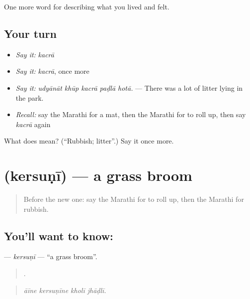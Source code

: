 \begin{grammarlens}[title={What you've built}]
One more word for describing what you lived and felt.
\end{grammarlens}

\subsection*{Your turn}
\begin{itemize}
\raggedright
  \item \emph{Say it:} \emph{kacrā}
  \item \emph{Say it:} \emph{kacrā}, once more
  \item \emph{Say it:} \emph{udyānāt khūp kacrā paḍlā hotā.} — There was a lot of litter lying in the park.
  \item \emph{Recall:} say the Marathi for a mat, then the Marathi for to roll up, then say \emph{kacrā} again
\end{itemize}

\begin{tcolorbox}[breakable,colback=teal!4,colframe=teal!35!black,title={Before you move on}]
What does  mean? (\textquotedblleft{}Rubbish; litter\textquotedblright{}.) Say it once more.
\end{tcolorbox}
\section[\texorpdfstring{\mr{केरसुणी} (kersuṇī)}{केरसुणी (kersuṇī)}]{ (kersuṇī) — a grass broom}

\label{lesson:MR-C524-kersuni}



\begin{quote}
Before the new one: say the Marathi for to roll up, then the Marathi for rubbish.
\end{quote}

\subsection*{You'll want to know: }
\textbf{} — \emph{kersuṇī} — \textquotedblleft{}a grass broom\textquotedblright{}.

\begin{quote}
   .
\end{quote}

\begin{quote}
\emph{āīne kersuṇīne kholī jhāḍlī.}
\end{quote}

